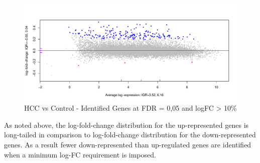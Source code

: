 \documentclass[
]{book}
\newenvironment{Shaded}{\begin{snugshade}}{\end{snugshade}}
\newcommand{\DataTypeTok}[1]{\textcolor[rgb]{0.13,0.29,0.53}{#1}}
\newcommand{\DecValTok}[1]{\textcolor[rgb]{0.00,0.00,0.81}{#1}}
\newcommand{\FloatTok}[1]{\textcolor[rgb]{0.00,0.00,0.81}{#1}}
\newcommand{\KeywordTok}[1]{\textcolor[rgb]{0.13,0.29,0.53}{\textbf{#1}}}
\newcommand{\NormalTok}[1]{#1}
\newcommand{\OperatorTok}[1]{\textcolor[rgb]{0.81,0.36,0.00}{\textbf{#1}}}
\newcommand{\StringTok}[1]{\textcolor[rgb]{0.31,0.60,0.02}{#1}}
\begin{document}
\begin{Shaded}
\end{Shaded}

\begin{figure}
\centering
\includegraphics{Static/figures/hcc5hmC-preproc-mdPlotTfit-1.pdf}
\caption{\label{fig:hcc5hmC-preproc-mdPlotTfit}HCC vs Control - Identified Genes at FDR = 0,05 and logFC \textgreater{} 10\%}
\end{figure}

As noted above, the log-fold-change distribution for the up-represented genes
is long-tailed in comparison to log-fold-change distribution for the down-represented genes.
As a result fewer down-represented than up-regulated genes are identified when a
minimum log-FC requirement is imposed.
\end{document}
